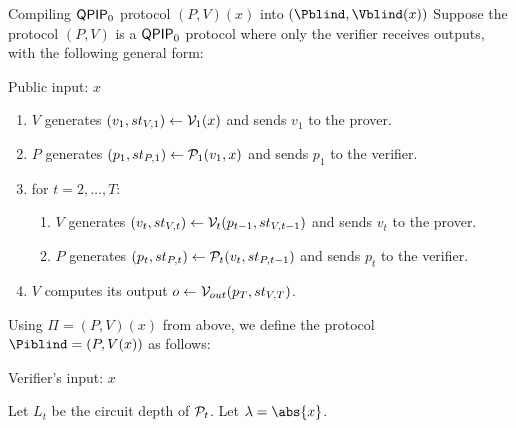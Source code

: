 
\begin{protocol}{Compiling $\operatorname{\mathsf{QPIP}}_0$ protocol $(P, V)(x)$ into $(\Pblind, \Vblind(x))$}
	Suppose the protocol $(P, V)$ is a $\operatorname{\mathsf{QPIP}}_0$ protocol where only the verifier receives outputs, with the following general form:
	
	Public input: $x$
	\begin{enumerate}
		\item $V$ generates $(v_1, st_{V, 1})\leftarrow\mathcal{V}_1(x)$ and sends $v_1$ to the prover.
		\item $P$ generates $(p_1, st_{P, 1})\leftarrow\mathcal{P}_1(v_1, x)$ and sends $p_1$ to the verifier.
		\item for $t=2,\ldots,T$:
		\begin{enumerate}
			\item $V$ generates $(v_t, st_{V, t})\leftarrow\mathcal{V}_t(p_{t-1}, st_{V, t-1})$ and sends $v_t$ to the prover.
			\item $P$ generates $(p_t, st_{P, t})\leftarrow\mathcal{P}_t(v_t, st_{P, t-1})$ and sends $p_t$ to the verifier.
		\end{enumerate}
		\item $V$ computes its output $o\leftarrow\mathcal{V}_{out}(p_T, st_{V, T})$.
	\end{enumerate}

	Using $\Pi=(P, V)(x)$ from above, we define the protocol $\Piblind=(P, V(x))$ as follows:

	Verifier's input: $x$

	Let $L_t$ be the circuit depth of $\mathcal{P}_t$.
	Let $\lambda=\abs{x}$.



\end{protocol}
